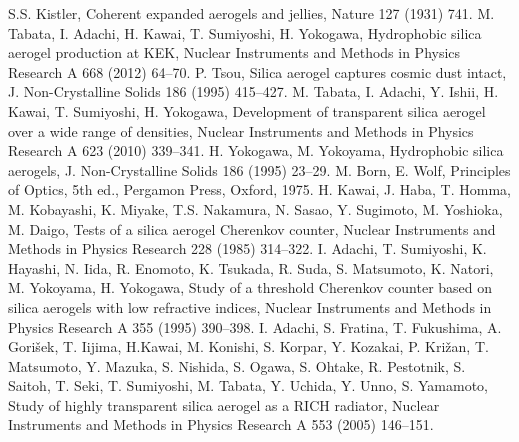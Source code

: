 \documentclass[5p,twocolumn]{elsarticle}
\begin{document}




% 



\begin{thebibliography}{00}
S.S. Kistler, Coherent expanded aerogels and jellies, Nature 127 (1931) 741.
M. Tabata, I. Adachi, H. Kawai, T. Sumiyoshi, H. Yokogawa, Hydrophobic silica aerogel production at KEK, Nuclear Instruments and Methods in Physics Research A 668 (2012) 64--70.
P. Tsou, Silica aerogel captures cosmic dust intact, J. Non-Crystalline Solids 186 (1995) 415--427.
M. Tabata, I. Adachi, Y. Ishii, H. Kawai, T. Sumiyoshi, H. Yokogawa, Development of transparent silica aerogel over a wide range of densities, Nuclear Instruments and Methods in Physics Research A 623 (2010) 339--341.
 H. Yokogawa, M. Yokoyama, Hydrophobic silica aerogels, J. Non-Crystalline Solids 186 (1995) 23--29.
M. Born, E. Wolf, Principles of Optics, 5th ed., Pergamon Press, Oxford, 1975.
H. Kawai, J. Haba, T. Homma, M. Kobayashi, K. Miyake, T.S. Nakamura, N. Sasao, Y. Sugimoto, M. Yoshioka, M. Daigo, Tests of a silica aerogel Cherenkov counter, Nuclear Instruments and Methods in Physics Research 228 (1985) 314--322.
I. Adachi, T. Sumiyoshi, K. Hayashi, N. Iida, R. Enomoto, K. Tsukada, R. Suda, S. Matsumoto, K. Natori, M. Yokoyama, H. Yokogawa, Study of a threshold Cherenkov counter based on silica aerogels with low refractive indices, Nuclear Instruments and Methods in Physics Research A 355 (1995) 390--398.
I. Adachi, S. Fratina, T. Fukushima, A. Gori\v{s}ek, T. Iijima, H.Kawai, M. Konishi, S. Korpar, Y. Kozakai, P. Kri\v{z}an, T. Matsumoto, Y. Mazuka, S. Nishida, S. Ogawa, S. Ohtake, R. Pestotnik, S. Saitoh, T. Seki, T. Sumiyoshi, M. Tabata, Y. Uchida, Y. Unno, S. Yamamoto, Study of highly transparent silica aerogel as a RICH radiator, Nuclear Instruments and Methods in Physics Research A 553 (2005) 146--151.

\end{thebibliography}
\end{document}
